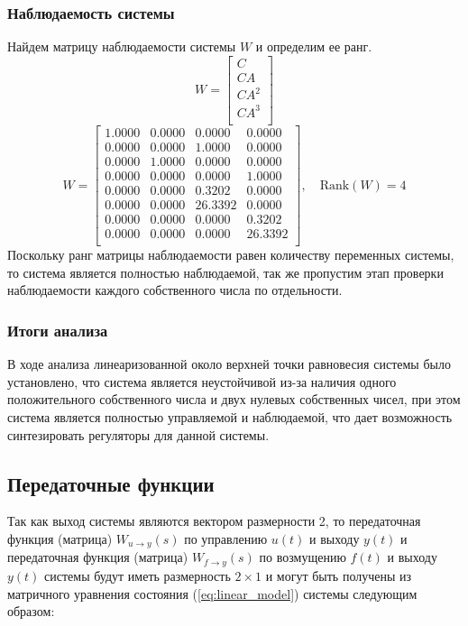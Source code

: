 \subsubsection{Наблюдаемость системы}
Найдем матрицу наблюдаемости системы $W$ и определим ее ранг.
\begin{equation}
    W = \begin{bmatrix}
    C \\ 
    CA \\ 
    CA^2 \\ 
    CA^3 \\ 
    \end{bmatrix}
\end{equation}
\begin{equation}
   W = \begin{bmatrix}
    1.0000  & 0.0000  & 0.0000  & 0.0000 \\ 
    0.0000  & 0.0000  & 1.0000  & 0.0000 \\ 
    0.0000  & 1.0000  & 0.0000  & 0.0000 \\ 
    0.0000  & 0.0000  & 0.0000  & 1.0000 \\ 
    0.0000  & 0.0000  & 0.3202  & 0.0000 \\ 
    0.0000  & 0.0000  & 26.3392  & 0.0000 \\ 
    0.0000  & 0.0000  & 0.0000  & 0.3202 \\ 
    0.0000  & 0.0000  & 0.0000  & 26.3392 \\ 
    \end{bmatrix}, \quad \text{Rank}(W) = 4
    \label{eq:observability_matrix}
\end{equation}
Поскольку ранг матрицы наблюдаемости равен количеству переменных системы, то система является полностью наблюдаемой, так же 
пропустим этап проверки наблюдаемости каждого собственного числа по отдельности. 

\subsubsection{Итоги анализа}
В ходе анализа линеаризованной около верхней точки равновесия системы было установлено, что система является
неустойчивой из-за наличия одного положительного собственного числа и двух нулевых собственных чисел, при этом 
система является полностью управляемой и наблюдаемой, что дает возможность синтезировать регуляторы для 
данной системы. 

\subsection{Передаточные функции}
Так как выход системы являются вектором размерности 2, то передаточная функция (матрица) $W_{u\rightarrow y}(s)$ по 
управлению $u(t)$ и выходу $y(t)$ и передаточная функция (матрица) $W_{f\rightarrow y}(s)$ по 
возмущению $f(t)$ и выходу $y(t)$ системы будут иметь размерность $2 \times 1$ и могут быть получены из матричного уравнения состояния
(\ref{eq:linear_model}) системы следующим образом:

